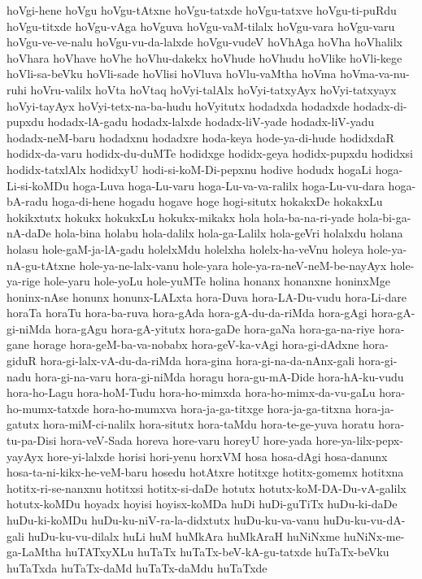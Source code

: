 {hoVgi-hene
hoVgu
hoVgu-tAtxne
hoVgu-tatxde
hoVgu-tatxve
hoVgu-ti-puRdu
hoVgu-titxde
hoVgu-vAga
hoVguva
hoVgu-vaM-tilalx
hoVgu-vara
hoVgu-varu
hoVgu-ve-ve-nalu
hoVgu-vu-da-lalxde
hoVgu-vudeV
hoVhAga
hoVha
hoVhalilx
hoVhara
hoVhave
hoVhe
hoVhu-dakekx
hoVhude
hoVhudu
hoVlike
hoVli-kege
hoVli-sa-beVku
hoVli-sade
hoVlisi
hoVluva
hoVlu-vaMtha
hoVma
hoVma-va-nu-ruhi
hoVru-valilx
hoVta
hoVtaq
hoVyi-talAlx
hoVyi-tatxyAyx
hoVyi-tatxyayx
hoVyi-tayAyx
hoVyi-tetx-na-ba-hudu
hoVyitutx
hodadxda
hodadxde
hodadx-di-pupxdu
hodadx-lA-gadu
hodadx-lalxde
hodadx-liV-yade
hodadx-liV-yadu
hodadx-neM-baru
hodadxnu
hodadxre
hoda-keya
hode-ya-di-hude
hodidxdaR
hodidx-da-varu
hodidx-du-duMTe
hodidxge
hodidx-geya
hodidx-pupxdu
hodidxsi
hodidx-tatxlAlx
hodidxyU
hodi-si-koM-Di-pepxnu
hodive
hodudx
hogaLi
hoga-Li-si-koMDu
hoga-Luva
hoga-Lu-varu
hoga-Lu-va-va-ralilx
hoga-Lu-vu-dara
hoga-bA-radu
hoga-di-hene
hogadu
hogave
hoge
hogi-situtx
hokakxDe
hokakxLu
hokikxtutx
hokukx
hokukxLu
hokukx-mikakx
hola
hola-ba-na-ri-yade
hola-bi-ga-nA-daDe
hola-bina
holabu
hola-dalilx
hola-ga-Lalilx
hola-geVri
holalxdu
holana
holasu
hole-gaM-ja-lA-gadu
holelxMdu
holelxha
holelx-ha-veVnu
holeya
hole-ya-nA-gu-tAtxne
hole-ya-ne-lalx-vanu
hole-yara
hole-ya-ra-neV-neM-be-nayAyx
hole-ya-rige
hole-yaru
hole-yoLu
hole-yuMTe
holina
honanx
honanxne
honinxMge
honinx-nAse
honunx
honunx-LALxta
hora-Duva
hora-LA-Du-vudu
hora-Li-dare
horaTa
horaTu
hora-ba-ruva
hora-gAda
hora-gA-du-da-riMda
hora-gAgi
hora-gA-gi-niMda
hora-gAgu
hora-gA-yitutx
hora-gaDe
hora-gaNa
hora-ga-na-riye
hora-gane
horage
hora-geM-ba-va-nobabx
hora-geV-ka-vAgi
hora-gi-dAdxne
hora-giduR
hora-gi-lalx-vA-du-da-riMda
hora-gina
hora-gi-na-da-nAnx-gali
hora-gi-nadu
hora-gi-na-varu
hora-gi-niMda
horagu
hora-gu-mA-Dide
hora-hA-ku-vudu
hora-ho-Lagu
hora-hoM-Tudu
hora-ho-mimxda
hora-ho-mimx-da-vu-gaLu
hora-ho-mumx-tatxde
hora-ho-mumxva
hora-ja-ga-titxge
hora-ja-ga-titxna
hora-ja-gatutx
hora-miM-ci-nalilx
hora-situtx
hora-taMdu
hora-te-ge-yuva
horatu
hora-tu-pa-Disi
hora-veV-Sada
horeva
hore-varu
horeyU
hore-yada
hore-ya-lilx-pepx-yayAyx
hore-yi-lalxde
horisi
hori-yenu
horxVM
hosa
hosa-dAgi
hosa-danunx
hosa-ta-ni-kikx-he-veM-baru
hosedu
hotAtxre
hotitxge
hotitx-gomemx
hotitxna
hotitx-ri-se-nanxnu
hotitxsi
hotitx-si-daDe
hotutx
hotutx-koM-DA-Du-vA-galilx
hotutx-koMDu
hoyadx
hoyisi
hoyisx-koMDa
huDi
huDi-guTiTx
huDu-ki-daDe
huDu-ki-koMDu
huDu-ku-niV-ra-la-didxtutx
huDu-ku-va-vanu
huDu-ku-vu-dA-gali
huDu-ku-vu-dilalx
huLi
huM
huMkAra
huMkAraH
huNiNxme
huNiNx-me-ga-LaMtha
huTATxyXLu
huTaTx
huTaTx-beV-kA-gu-tatxde
huTaTx-beVku
huTaTxda
huTaTx-daMd
huTaTx-daMdu
huTaTxde
}
